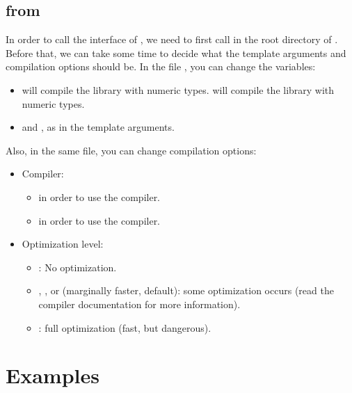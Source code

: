 \documentclass[10pt,utf8,compress,xcolor=dvipsnames]{beamer}
\begin{document}
\subsection{\mimes from \PY}
\begin{frame}[fragile]{\insertsubsectionhead}
	In order to call the \PY interface of \mimes, we need to first call  in the root directory of \mimes.\\[0.2cm]
	
	Before that, we can take some time to decide what the template arguments and compilation  options should be. In the 
	file , you can change the variables:
	\begin{itemize}
		\item {} will compile the library with  numeric types.  will compile the library with  numeric types.
		\item {} and , as in the template arguments.
	\end{itemize}
	
	Also, in the same file, you can change compilation options:
	\begin{itemize}
		\item Compiler:
		\begin{itemize}
			\item {} in order to use the  \CPP compiler.
			\item {} in order to use the  \CPP compiler.
		\end{itemize}
	\item Optimization level:
		\begin{itemize}
			\item {}: No optimization. 
			\item {}, , or  (marginally faster, default): some optimization occurs (read the compiler documentation for more information).
			\item {}: full optimization (fast, but dangerous). 
		\end{itemize}
	\end{itemize}
\end{frame}


\section{Examples}
\end{document}
